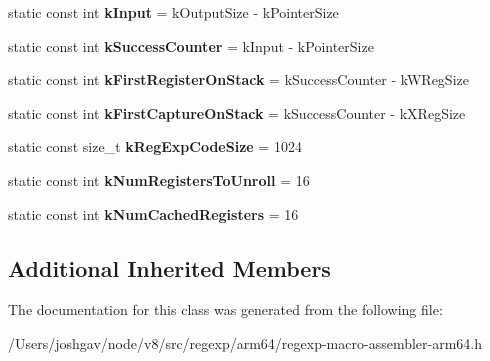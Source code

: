 \begin{DoxyCompactItemize}
\item 
static const int {\bfseries k\+Input} = k\+Output\+Size -\/ k\+Pointer\+Size\hypertarget{classv8_1_1internal_1_1_reg_exp_macro_assembler_a_r_m64_ad20de8f3dd57497e5bccb366822c2ffa}{}\label{classv8_1_1internal_1_1_reg_exp_macro_assembler_a_r_m64_ad20de8f3dd57497e5bccb366822c2ffa}

\item 
static const int {\bfseries k\+Success\+Counter} = k\+Input -\/ k\+Pointer\+Size\hypertarget{classv8_1_1internal_1_1_reg_exp_macro_assembler_a_r_m64_ab8889609f74b2efd8ae781eb61177149}{}\label{classv8_1_1internal_1_1_reg_exp_macro_assembler_a_r_m64_ab8889609f74b2efd8ae781eb61177149}

\item 
static const int {\bfseries k\+First\+Register\+On\+Stack} = k\+Success\+Counter -\/ k\+W\+Reg\+Size\hypertarget{classv8_1_1internal_1_1_reg_exp_macro_assembler_a_r_m64_ae356cfba568645f6a76ffe641b08c5ab}{}\label{classv8_1_1internal_1_1_reg_exp_macro_assembler_a_r_m64_ae356cfba568645f6a76ffe641b08c5ab}

\item 
static const int {\bfseries k\+First\+Capture\+On\+Stack} = k\+Success\+Counter -\/ k\+X\+Reg\+Size\hypertarget{classv8_1_1internal_1_1_reg_exp_macro_assembler_a_r_m64_acd57bd0ebdf3496b5d1d8e85b3090aa0}{}\label{classv8_1_1internal_1_1_reg_exp_macro_assembler_a_r_m64_acd57bd0ebdf3496b5d1d8e85b3090aa0}

\item 
static const size\+\_\+t {\bfseries k\+Reg\+Exp\+Code\+Size} = 1024\hypertarget{classv8_1_1internal_1_1_reg_exp_macro_assembler_a_r_m64_a3ae93382bff16a8e9bd0b7089bed5bb6}{}\label{classv8_1_1internal_1_1_reg_exp_macro_assembler_a_r_m64_a3ae93382bff16a8e9bd0b7089bed5bb6}

\item 
static const int {\bfseries k\+Num\+Registers\+To\+Unroll} = 16\hypertarget{classv8_1_1internal_1_1_reg_exp_macro_assembler_a_r_m64_a9adf20f06dc7ba1e35c49407e6693b50}{}\label{classv8_1_1internal_1_1_reg_exp_macro_assembler_a_r_m64_a9adf20f06dc7ba1e35c49407e6693b50}

\item 
static const int {\bfseries k\+Num\+Cached\+Registers} = 16\hypertarget{classv8_1_1internal_1_1_reg_exp_macro_assembler_a_r_m64_aed07d977205e6249bb30d80b4e1e7023}{}\label{classv8_1_1internal_1_1_reg_exp_macro_assembler_a_r_m64_aed07d977205e6249bb30d80b4e1e7023}

\end{DoxyCompactItemize}
\subsection*{Additional Inherited Members}


The documentation for this class was generated from the following file\+:\begin{DoxyCompactItemize}
\item 
/\+Users/joshgav/node/v8/src/regexp/arm64/regexp-\/macro-\/assembler-\/arm64.\+h\end{DoxyCompactItemize}
